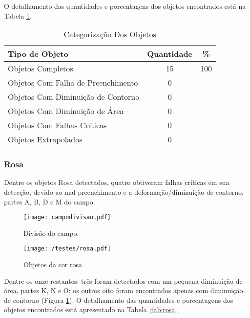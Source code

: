 	O detalhamento das quantidades e porcentagens dos objetos encontrados está na Tabela \ref{tab:verde}.
\begin{table}[h]
\centering
\begin{tabular}{l|c|c}
Tipo de Objeto & Quantidade & \% \\ %
\hline                               %
Objetos Completos &  15 &100 \\
\hline 
Objetos Com Falha de Preenchimento & 0\\
\hline 
Objetos Com Diminuição de Contorno &  0\\
\hline 
Objetos Com Diminuição de Área &  0 \\
\hline 
Objetos Com Falhas Críticas & 0 \\
\hline \hline 
Objetos Extrapolados & 0 \\
\hline 
\end{tabular}
\caption{Categorização Dos Objetos}
\label{tab:verde}
\end{table}	
\newpage
\subsubsection{Rosa}

	
Dentre os objetos Rosa detectados, quatro obtiveram falhas críticas em sua detecção, devido ao mal preenchimento e a deformação/diminuição de contorno, partes A, B, D e M do campo.
	
	\begin{figure}[H]
		\begin{minipage}[b]{0.45\linewidth}
			\centering
			\texttt{[image: campodivisao.pdf]}
			\caption{Divisão do campo.}				
		\end{minipage}
		\hspace{0.5cm}
		\begin{minipage}[b]{0.45\linewidth}
			\centering
			\texttt{[image: /testes/rosa.pdf]}
			\caption{Objetos da cor rosa}
			\label{fig:rosa}
		\end{minipage}
	\end{figure}

 Dentre os onze restantes: três foram detectados com um pequena diminuição de área, partes K, N e O; os outros oito foram encontrados apenas com diminuição de contorno (Figura \ref{fig:rosa}).  O detalhamento das quantidades e porcentagens dos objetos encontrados está apresentado na Tabela \ref{tab:rosa},
	
